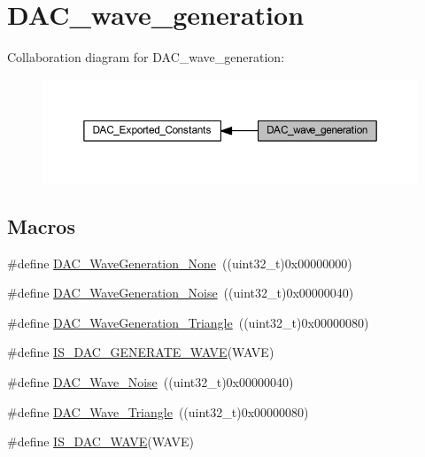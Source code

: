 \hypertarget{group___d_a_c__wave__generation}{}\section{D\+A\+C\+\_\+wave\+\_\+generation}
\label{group___d_a_c__wave__generation}
Collaboration diagram for D\+A\+C\+\_\+wave\+\_\+generation\+:
\nopagebreak
\begin{figure}[H]
\begin{center}
\leavevmode
\includegraphics[width=350pt]{group___d_a_c__wave__generation}
\end{center}
\end{figure}
\subsection*{Macros}
\begin{DoxyCompactItemize}
\item 
\#define \hyperlink{group___d_a_c__wave__generation_gaabbcd575d6106267f6b65ce988158f29}{D\+A\+C\+\_\+\+Wave\+Generation\+\_\+\+None}~((uint32\+\_\+t)0x00000000)
\item 
\#define \hyperlink{group___d_a_c__wave__generation_ga1692990325098cae6f32182c1fa0f61e}{D\+A\+C\+\_\+\+Wave\+Generation\+\_\+\+Noise}~((uint32\+\_\+t)0x00000040)
\item 
\#define \hyperlink{group___d_a_c__wave__generation_ga68f1a71011437a5ea6298ab039554714}{D\+A\+C\+\_\+\+Wave\+Generation\+\_\+\+Triangle}~((uint32\+\_\+t)0x00000080)
\item 
\#define \hyperlink{group___d_a_c__wave__generation_ga50fb2dd12305cd7bd0b738a1f6388d3c}{I\+S\+\_\+\+D\+A\+C\+\_\+\+G\+E\+N\+E\+R\+A\+T\+E\+\_\+\+W\+A\+VE}(W\+A\+VE)
\item 
\#define \hyperlink{group___d_a_c__wave__generation_ga09c5ee68f8e726b1c039df1f6e195965}{D\+A\+C\+\_\+\+Wave\+\_\+\+Noise}~((uint32\+\_\+t)0x00000040)
\item 
\#define \hyperlink{group___d_a_c__wave__generation_ga95a1566e1728e1e345e8f3b50629a075}{D\+A\+C\+\_\+\+Wave\+\_\+\+Triangle}~((uint32\+\_\+t)0x00000080)
\item 
\#define \hyperlink{group___d_a_c__wave__generation_ga45c25065fb713820f6dbae0009376e1c}{I\+S\+\_\+\+D\+A\+C\+\_\+\+W\+A\+VE}(W\+A\+VE)
\end{DoxyCompactItemize}



